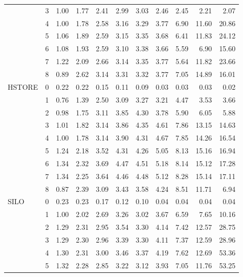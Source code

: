 \begin{tabular}{llrrrrrrrrr}
       & 3 &  1.00 &  1.77 &  2.41 &  2.99 &  3.03 &  2.46 &  2.45 &  2.21 &  2.07 \\
       & 4 &  1.00 &  1.78 &  2.58 &  3.16 &  3.29 &  3.77 &  6.90 & 11.60 & 20.86 \\
       & 5 &  1.06 &  1.89 &  2.59 &  3.15 &  3.35 &  3.68 &  6.41 & 11.83 & 24.12 \\
       & 6 &  1.08 &  1.93 &  2.59 &  3.10 &  3.38 &  3.66 &  5.59 &  6.90 & 15.60 \\
       & 7 &  1.22 &  2.09 &  2.66 &  3.14 &  3.35 &  3.77 &  5.64 & 11.82 & 23.66 \\
       & 8 &  0.89 &  2.62 &  3.14 &  3.31 &  3.32 &  3.77 &  7.05 & 14.89 & 16.01 \\
HSTORE & 0 &  0.22 &  0.22 &  0.15 &  0.11 &  0.09 &  0.03 &  0.03 &  0.03 &  0.02 \\
       & 1 &  0.76 &  1.39 &  2.50 &  3.09 &  3.27 &  3.21 &  4.47 &  3.53 &  3.66 \\
       & 2 &  0.98 &  1.75 &  3.11 &  3.85 &  4.30 &  3.78 &  5.90 &  6.05 &  5.88 \\
       & 3 &  1.01 &  1.82 &  3.14 &  3.86 &  4.35 &  4.61 &  7.86 & 13.15 & 14.63 \\
       & 4 &  1.00 &  1.78 &  3.14 &  3.90 &  4.31 &  4.67 &  7.85 & 14.26 & 16.54 \\
       & 5 &  1.24 &  2.18 &  3.52 &  4.31 &  4.26 &  5.05 &  8.13 & 15.16 & 16.94 \\
       & 6 &  1.34 &  2.32 &  3.69 &  4.47 &  4.51 &  5.18 &  8.14 & 15.12 & 17.28 \\
       & 7 &  1.34 &  2.25 &  3.64 &  4.46 &  4.48 &  5.12 &  8.28 & 15.14 & 17.11 \\
       & 8 &  0.87 &  2.39 &  3.09 &  3.43 &  3.58 &  4.24 &  8.51 & 11.71 &  6.94 \\
SILO & 0 &  0.23 &  0.23 &  0.17 &  0.12 &  0.10 &  0.04 &  0.04 &  0.04 &  0.04 \\
       & 1 &  1.00 &  2.02 &  2.69 &  3.26 &  3.02 &  3.67 &  6.59 &  7.65 & 10.16 \\
       & 2 &  1.29 &  2.31 &  2.95 &  3.54 &  3.30 &  4.14 &  7.42 & 12.57 & 28.75 \\
       & 3 &  1.29 &  2.30 &  2.96 &  3.39 &  3.30 &  4.11 &  7.37 & 12.59 & 28.96 \\
       & 4 &  1.30 &  2.31 &  3.00 &  3.46 &  3.37 &  4.19 &  7.62 & 12.69 & 53.36 \\
       & 5 &  1.32 &  2.28 &  2.85 &  3.22 &  3.12 &  3.93 &  7.05 & 11.76 & 53.25 \\

\end{tabular}
